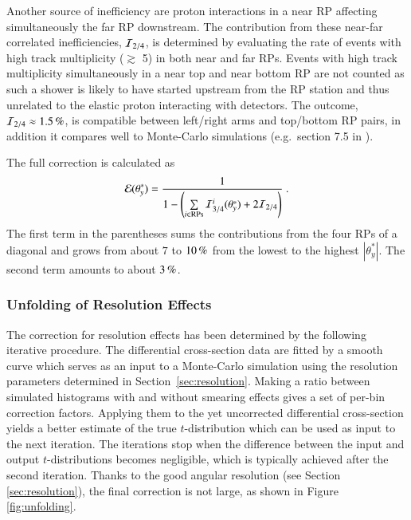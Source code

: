 Another source of inefficiency are proton interactions in a near RP affecting simultaneously the far RP downstream. The contribution from these near-far correlated inefficiencies, ${\cal I}_{2/4}$, is determined by evaluating the rate of events with high track multiplicity ($\gtrsim$ 5) in both near and far RPs. Events with high track multiplicity simultaneously in a near top and near bottom RP are not counted as such a shower is likely to have started upstream from the RP station and thus unrelated to the elastic proton interacting with detectors. The outcome, ${\cal I}_{2/4} \approx 1.5\,{\rm \%}$, is compatible between left/right arms and top/bottom RP pairs, in addition it compares well to Monte-Carlo simulations (e.g.~section 7.5 in \cite{hubert-thesis}).

The full correction is calculated as
\begin{equation}
\label{efficiency}
	{\cal E}(\theta_y^*) = {1\over 1 - \left( \sum\limits_{i\in \rm RPs} {\cal I}^i_{3/4}(\theta_y^*) + 2 {\cal I}_{2/4} \right) } \ .
\end{equation}
The first term in the parentheses sums the contributions from the four RPs of a diagonal and grows from about $7$ to $10\,{\rm \%}$ from the lowest to the highest $|\theta_y^*|$. The second term amounts to about $3\,{\rm \%}$.





\subsubsection{Unfolding of Resolution Effects}
\label{sec:unfolding}

The correction for resolution effects has been determined by the following iterative procedure. The differential cross-section data are fitted by a smooth curve which serves as an input to a Monte-Carlo simulation using the resolution parameters determined in Section~\ref{sec:resolution}. Making a ratio between simulated histograms with and without smearing effects gives a set of per-bin correction factors. Applying them to the yet uncorrected differential cross-section yields a better estimate of the true $t$-distribution which can be used as input to the next iteration. The iterations stop when the difference between the input and output $t$-distributions becomes negligible, which is typically achieved after the second iteration. Thanks to the good angular resolution (see Section \ref{sec:resolution}), the final correction is not large, as shown in Figure \ref{fig:unfolding}.

